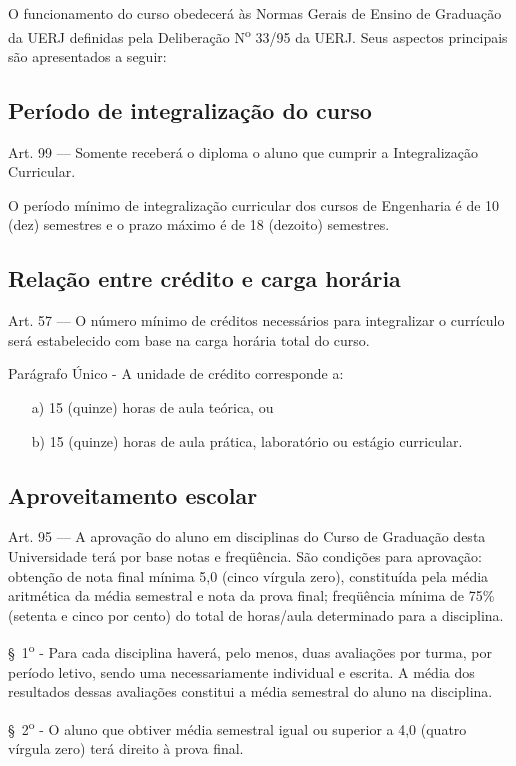O funcionamento do curso obedecerá às Normas Gerais de Ensino de Graduação da UERJ definidas pela Deliberação N\textsuperscript{o} 33/95 da UERJ. Seus aspectos principais são apresentados a seguir:

\subsection{Período de integralização do curso}
Art. 99 –-- Somente receberá o diploma o aluno que cumprir a Integralização Curricular.

O período mínimo de integralização curricular dos cursos de Engenharia é de 10 (dez) semestres e o prazo máximo é de 18 (dezoito) semestres.

\subsection{Relação entre crédito e carga horária}
Art. 57 –-- O número mínimo de créditos necessários para integralizar o currículo será estabelecido com base na carga horária total do curso.

Parágrafo Único - A unidade de crédito corresponde a:
\begin{itemize}
    \item[a)] 15 (quinze) horas de aula teórica, ou
    \item[b)] 15 (quinze) horas de aula prática, laboratório ou estágio curricular.
\end{itemize}

\subsection{Aproveitamento escolar}
Art. 95 –-- A aprovação do aluno em disciplinas do Curso de Graduação desta Universidade terá por base notas e freqüência. São condições para aprovação: obtenção de nota final mínima 5,0 (cinco vírgula zero), constituída pela média aritmética da média semestral e nota da prova final; freqüência mínima de 75\% (setenta e cinco por cento) do total de horas/aula determinado para a disciplina.

\S~1\textsuperscript{o} - Para cada disciplina haverá, pelo menos, duas avaliações por turma, por período letivo, sendo uma necessariamente individual e escrita. A média dos resultados dessas avaliações constitui a média semestral do aluno na disciplina.

\S~2\textsuperscript{o} - O aluno que obtiver média semestral igual ou superior a 4,0 (quatro vírgula zero) terá direito à prova final.

